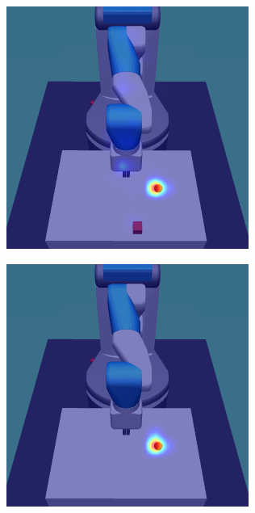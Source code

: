 \begin{figure}[h!]
\begin{subfigure}{0.24\columnwidth}
  \end{subfigure}
  \begin{subfigure}{0.24\columnwidth}
    \includegraphics[width=\linewidth]{figures/chapter6/distractor_saliency_fetch_pro_off/shape_visual_random}
  \end{subfigure}
  \begin{subfigure}{0.24\columnwidth}
    \includegraphics[width=\linewidth]{figures/chapter6/distractor_saliency_fetch_pro_on/standard_sensor_random}
  \end{subfigure}
  

\end{figure}
